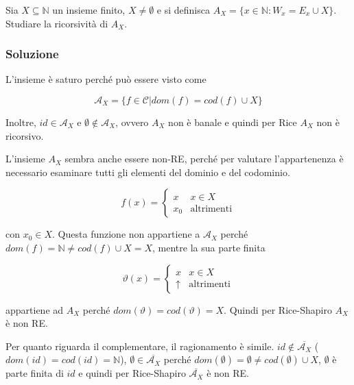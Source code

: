 Sia $X \subseteq \mathbb{N}$ un insieme finito, $X \neq \emptyset$ e si definisca $A_X = \{x \in \mathbb{N} : W_x = E_x \cup X \}$. Studiare la ricorsività di $A_X$.

\subsubsection{Soluzione}

L'insieme è saturo perché può essere visto come

$$
\mathcal{A}_X = \{ f \in\mathcal{C} | dom(f) = cod(f) \cup X \}
$$

Inoltre, $id \in \mathcal{A}_X$ e $\emptyset \notin \mathcal{A}_X$, ovvero $A_X$ non è banale e quindi per Rice $A_X$ non è ricorsivo.

L'insieme $A_X$ sembra anche essere non-RE, perché per valutare l'appartenenza è necessario esaminare tutti gli elementi del dominio e del codominio.




$$
f(x) = \begin{cases}
x & x \in X \\
x_0 & \text{altrimenti}
\end{cases}
$$

con $x_0 \in X$. Questa funzione non appartiene a $\mathcal{A}_X$ perché $dom(f) = \mathbb{N} \neq cod(f)\cup X = X$, mentre la sua parte finita

$$
\vartheta(x) = \begin{cases}
x & x \in X \\
\uparrow & \text{altrimenti}
\end{cases}
$$

appartiene ad $A_X$ perché $dom(\vartheta) = cod(\vartheta) = X$. Quindi per Rice-Shapiro $A_X$ è non RE.

Per quanto riguarda il complementare, il ragionamento è simile. $id \notin \overline{\mathcal{A}_X}$ ($dom(id) = cod(id) = \mathbb{N}$), $\emptyset \in \overline{\mathcal{A}_X}$ perché $dom(\emptyset) = \emptyset \neq cod(\emptyset) \cup X$, $\emptyset$ è parte finita di $id$ e quindi per Rice-Shapiro $\overline{\mathcal{A}_X}$ è non RE.


